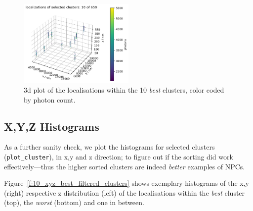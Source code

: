 \documentclass[11pt, a4paper, oneside, twocolumn]{report}
\renewcommand{\tt}{\texttt}
\newcommand{\e}{\emph}
\begin{document}


\begin{figure}[h!]
  \centering
  \includegraphics[width=0.5\textwidth]{8_best_filtered_clusters.png}
  \caption{3d plot of the localisations within the 10 \e{best}
    clusters, color coded by photon count.}
  \label{f:89_best_filtered_clusters}
\end{figure}


\subsection{X,Y,Z Histograms}\label{s:r:xyzhist}

As a further sanity check, we plot the histograms for selected
clusters (\tt{plot\_cluster}), in x,y and z direction; to figure out
if the sorting did work effectively---thus the higher sorted clusters
are indeed \e{better} examples of NPCs.

Figure~\ref{f:10_xyz_best_filtered_clusters} shows exemplary
histograms of the x,y (right) respective z distribution (left) of the
localisations within the \e{best} cluster (top), the \e{worst}
(bottom) and one in between.

\end{document}
